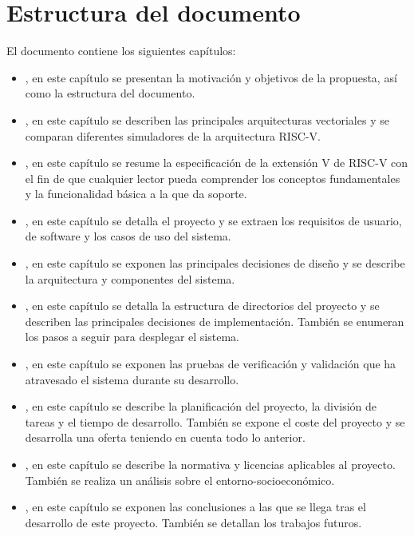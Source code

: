 \section{Estructura del documento}\label{sec:structure}
El documento contiene los siguientes capítulos:
\begin{itemize}
  \item {}, en este capítulo se presentan la motivación y objetivos de la propuesta, así como la estructura del documento.
  \item {}, en este capítulo se describen las principales arquitecturas vectoriales y se comparan diferentes simuladores de la arquitectura RISC-V.
  \item {}, en este capítulo se resume la especificación de la extensión V de RISC-V con el fin de que cualquier lector pueda comprender los conceptos fundamentales y la funcionalidad básica a la que da soporte.
  \item {}, en este capítulo se detalla el proyecto y se extraen los requisitos de usuario, de software y los casos de uso del sistema.
  \item {}, en este capítulo se exponen las principales decisiones de diseño y se describe la arquitectura y componentes del sistema.
  \item {}, en este capítulo se detalla la estructura de directorios del proyecto y se describen las principales decisiones de implementación. También se enumeran los pasos a seguir para desplegar el sistema.
  \item {}, en este capítulo se exponen las pruebas de verificación y validación que ha atravesado el sistema durante su desarrollo.
  \item {}, en este capítulo se describe la planificación del proyecto, la división de tareas y el tiempo de desarrollo. También se expone el coste del proyecto y se desarrolla una oferta teniendo en cuenta todo lo anterior.
  \item {}, en este capítulo se describe la normativa y licencias aplicables al proyecto. También se realiza un análisis sobre el entorno-socioeconómico.
  \item {}, en este capítulo se exponen las conclusiones a las que se llega tras el desarrollo de este proyecto. También se detallan los trabajos futuros.
\end{itemize}
